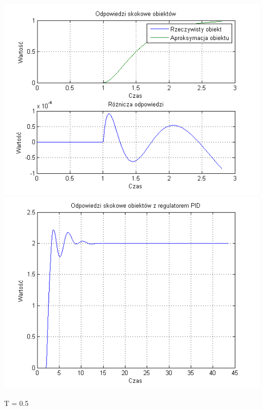 \documentclass[10pt,a4paper]{article}
\begin{document}
\begin{center}
\includegraphics[scale=1]{images/dwa/skrypt_53.png}\\
\includegraphics[scale=1]{images/dwa/skrypt_54.png}\\
\end{center}
\newpage
T = 0.5
\end{document}
